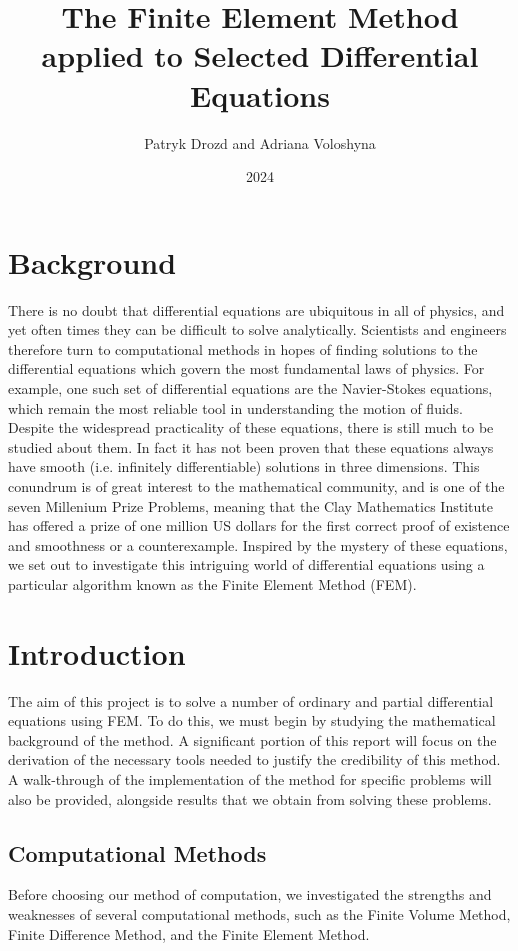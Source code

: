 \documentclass{article}
\title{The Finite Element Method applied to Selected Differential Equations}
\author{Patryk Drozd and Adriana Voloshyna }
\date{2024}
\begin{document}
\maketitle

\section{Background}
There is no doubt that differential equations are ubiquitous in all of physics, and yet often times they can be difficult to solve analytically. Scientists and engineers therefore turn to computational methods in hopes of finding solutions to the differential equations which govern the most fundamental laws of physics. For example, one such set of differential equations are the Navier-Stokes equations, which remain the most reliable tool in understanding the motion of fluids. Despite the widespread practicality of these equations, there is still much to be studied about them. In fact it has not been proven that these equations always have smooth (i.e. infinitely differentiable) solutions in three dimensions. This conundrum is of great interest to the mathematical community, and is one of the seven Millenium Prize Problems, meaning that the Clay Mathematics Institute has offered a prize of one million US dollars for the first correct proof of existence and smoothness or a counterexample. Inspired by the mystery of these equations, we set out to investigate this intriguing world of differential equations using a particular algorithm known as the Finite Element Method (FEM). 


\section{Introduction}
The aim of this project is to solve a number of ordinary and partial differential equations using FEM. To do this, we must begin by studying the mathematical background of the method. A significant portion of this report will focus on the derivation of the necessary tools needed to justify the credibility of this method. A walk-through of the implementation of the method for specific problems will also be provided, alongside results that we obtain from solving these problems. 
\subsection{Computational Methods}
Before choosing our method of computation, we investigated the strengths and weaknesses of several computational methods, such as the Finite Volume Method, Finite Difference Method, and the Finite Element Method.
\end{document}
